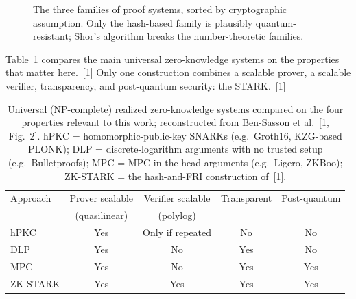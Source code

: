 \documentclass[11pt]{article}
\begin{document}
\begin{figure}[H]\centering
{}
\caption{The three families of proof systems, sorted by cryptographic assumption. Only the hash-based
family is plausibly quantum-resistant; Shor's algorithm breaks the number-theoretic families.}
\label{fig:assumptions}
\end{figure}

Table~\ref{tab:t1} compares the main universal zero-knowledge systems on the properties that matter
here.~[1] Only one construction combines a scalable prover, a scalable verifier, transparency, and
post-quantum security: the STARK.~[1]

\begin{table}[htbp]\centering\footnotesize
\caption{Universal (NP-complete) realized zero-knowledge systems compared on the four properties
relevant to this work; reconstructed from Ben-Sasson et al.~[1, Fig.~2]. hPKC = homomorphic-public-key
SNARKs (e.g.\ Groth16, KZG-based PLONK); DLP = discrete-logarithm arguments with no trusted setup
(e.g.\ Bulletproofs); MPC = MPC-in-the-head arguments (e.g.\ Ligero, ZKBoo); ZK-STARK = the hash-and-FRI
construction of~[1].}
\label{tab:t1}
\begin{tabular}{l c c c c}
\toprule
Approach & Prover scalable & Verifier scalable & Transparent & Post-quantum \\
         & (quasilinear)   & (polylog)         &             &              \\
\midrule
hPKC     & Yes & Only if repeated & No  & No  \\
DLP      & Yes & No               & Yes & No  \\
MPC      & Yes & No               & Yes & Yes \\
ZK-STARK & Yes & Yes              & Yes & Yes \\
\bottomrule
\end{tabular}
\end{table}
\end{document}
